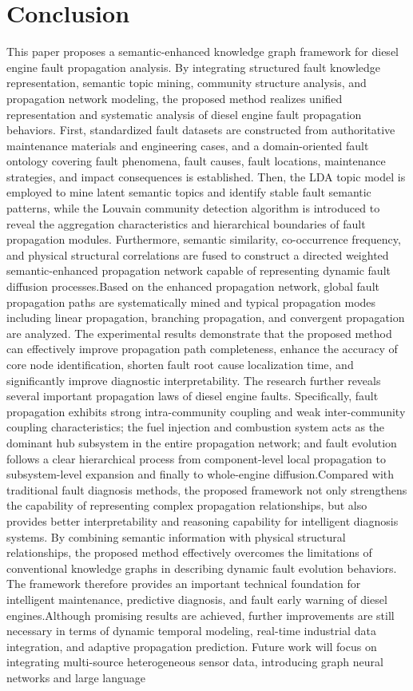 \documentclass[conference]{IEEEconf}
\begin{document}
\section{Conclusion}
This paper proposes a semantic-enhanced knowledge graph framework for diesel engine fault propagation analysis. By integrating structured fault knowledge representation, semantic topic mining, community structure analysis, and propagation network modeling, the proposed method realizes unified representation and systematic analysis of diesel engine fault propagation behaviors. First, standardized fault datasets are constructed from authoritative maintenance materials and engineering cases, and a domain-oriented fault ontology covering fault phenomena, fault causes, fault locations, maintenance strategies, and impact consequences is established. Then, the LDA topic model is employed to mine latent semantic topics and identify stable fault semantic patterns, while the Louvain community detection algorithm is introduced to reveal the aggregation characteristics and hierarchical boundaries of fault propagation modules. Furthermore, semantic similarity, co-occurrence frequency, and physical structural correlations are fused to construct a directed weighted semantic-enhanced propagation network capable of representing dynamic fault diffusion processes.Based on the enhanced propagation network, global fault propagation paths are systematically mined and typical propagation modes including linear propagation, branching propagation, and convergent propagation are analyzed. The experimental results demonstrate that the proposed method can effectively improve propagation path completeness, enhance the accuracy of core node identification, shorten fault root cause localization time, and significantly improve diagnostic interpretability. The research further reveals several important propagation laws of diesel engine faults. Specifically, fault propagation exhibits strong intra-community coupling and weak inter-community coupling characteristics; the fuel injection and combustion system acts as the dominant hub subsystem in the entire propagation network; and fault evolution follows a clear hierarchical process from component-level local propagation to subsystem-level expansion and finally to whole-engine diffusion.Compared with traditional fault diagnosis methods, the proposed framework not only strengthens the capability of representing complex propagation relationships, but also provides better interpretability and reasoning capability for intelligent diagnosis systems. By combining semantic information with physical structural relationships, the proposed method effectively overcomes the limitations of conventional knowledge graphs in describing dynamic fault evolution behaviors. The framework therefore provides an important technical foundation for intelligent maintenance, predictive diagnosis, and fault early warning of diesel engines.Although promising results are achieved, further improvements are still necessary in terms of dynamic temporal modeling, real-time industrial data integration, and adaptive propagation prediction. Future work will focus on integrating multi-source heterogeneous sensor data, introducing graph neural networks and large language 
\end{document}
